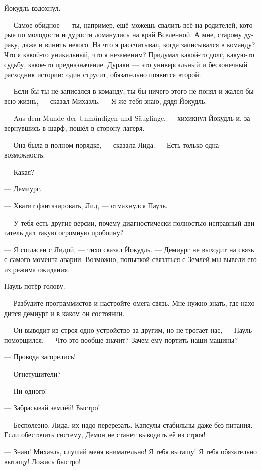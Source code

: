 \documentclass[a4paper,10pt,fleqn]{book}\usepackage{polyglossia}\setdefaultlanguage[babelshorthands=true]{russian}\setotherlanguage{english}\defaultfontfeatures{Ligatures=TeX,Mapping=tex-text}\usepackage{xcolor}\newcommand{\ml}[3]{#2}
\newcommand{\asterism}{\vspace{1em}{\centering\Large\bfseries$\ast~\ast~\ast$\par}\vspace{1em}}
\begin{document}
Йокудль вздохнул.

--- Самое обидное --- ты, например, ещё можешь свалить всё на родителей, которые по молодости и дурости ломанулись на край Вселенной.
А мне, старому дураку, даже и винить некого.
На что я рассчитывал, когда записывался в команду?
Что я какой-то уникальный, что я незаменим?
Придумал какой-то долг, какую-то судьбу, какое-то предназначение.
Дураки --- это универсальный и бесконечный расходник истории: один струсит, обязательно появится второй.

--- Если бы ты не записался в команду, ты бы ничего этого не понял и жалел бы всю жизнь, --- сказал Михаэль.
--- Я же тебя знаю, дядя Йокудль.

--- Aus dem Munde der Unmündigen und Säuglinge, --- хихикнул Йокудль и, завернувшись в шарф, пошёл в сторону лагеря.

\asterism

--- Она была в полном порядке, --- сказала Лида.
--- Есть только одна возможность.

--- Какая?

--- Демиург.

--- Хватит фантазировать, Лид, --- отмахнулся Пауль.

--- У тебя есть другие версии, почему диагностически полностью исправный двигатель дал такую огромную пробоину?

--- Я согласен с Лидой, --- тихо сказал Йокудль.
--- Демиург не выходит на связь с самого момента аварии.
Возможно, попыткой связаться с Землёй мы вывели его из режима ожидания.

Пауль потёр голову.

--- Разбудите программистов и настройте омега-связь.
Мне нужно знать, где находится демиург и в каком он состоянии.

\asterism

--- Он выводит из строя одно устройство за другим, но не трогает нас, --- Пауль поморщился.
--- Что это вообще значит?
Зачем ему портить наши машины?

\asterism

--- Провода загорелись!

--- Огнетушители?

--- Ни одного!

--- Забрасывай землёй!
Быстро!

--- Бесполезно.
Лида, их надо перерезать.
Капсулы стабильны даже без питания.
Если обесточить систему, Демон не станет выводить её из строя!

--- Знаю!
Михаэль, слушай меня внимательно!
Я тебя вытащу!
Я тебя обязательно вытащу!
Ложись быстро!
\end{document}
